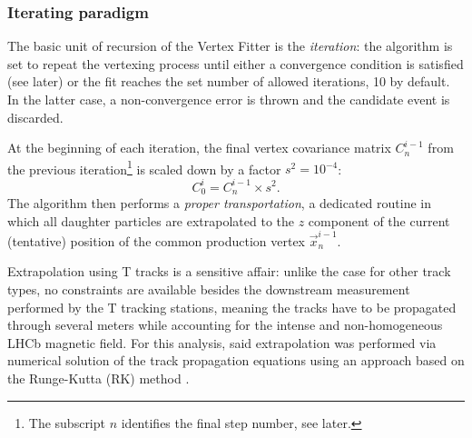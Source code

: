 \subsubsection{Iterating paradigm}
The basic unit of recursion of the Vertex Fitter is the \textit{iteration}:
the algorithm is set to repeat the vertexing process until either a convergence condition is satisfied (see later) or the fit reaches the set number of allowed iterations, 10 by default.
In the latter case, a non-convergence error is thrown and the candidate event is discarded.

At the beginning of each iteration, the final vertex covariance matrix $C^{i-1}_n$ from the previous iteration\footnote{The subscript $n$ identifies the final step number, see later.} is scaled down by a factor $s^2 = {10}^{-4}$:
\begin{equation}
	C^{i}_0 = C^{i-1}_n \times s^2.
\end{equation}
The algorithm then performs a \textit{proper transportation}, a dedicated routine in which all daughter particles are extrapolated to the $z$ component of the current (tentative) position of the common production vertex $\vec{x}_n^{i-1}$.

Extrapolation using T tracks is a sensitive affair:
unlike the case for other track types, no constraints are available besides the downstream measurement performed by the T tracking stations, meaning the tracks have to be propagated through several meters while accounting for the intense and non-homogeneous LHCb magnetic field.
For this analysis, said extrapolation was performed via numerical solution of the track propagation equations using an approach based on the Runge-Kutta (RK) method \cite{Bos:1070314} \cite{Hairer1993}.

%
%

